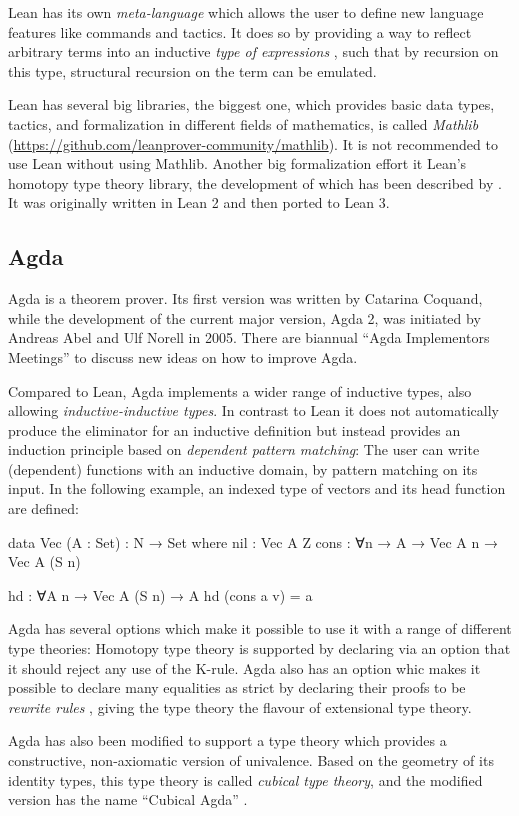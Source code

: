 Lean has its own \emph{meta-language} which allows the user to define new
language features like commands and tactics.
It does so by providing a way to reflect arbitrary terms into an inductive \emph{type of
expressions} ,
such that by recursion on this type, structural recursion on the term can 
be emulated.

Lean has several big libraries, the biggest one, which provides basic data types,
tactics, and formalization in different fields of mathematics, is called
\emph{Mathlib} (\url{https://github.com/leanprover-community/mathlib}).
It is not recommended to use Lean without using Mathlib.
Another big formalization effort it Lean's homotopy type theory library,
the development of which has been described by \citet{leanhott}.
It was originally written in Lean 2 and then ported to Lean 3.

\subsection{Agda}

Agda is a theorem prover. Its first version was written by Catarina Coquand, while
the development of the current major version, Agda 2, was initiated by
Andreas Abel and Ulf Norell in 2005.
There are biannual ``Agda Implementors Meetings'' to discuss new ideas on how to
improve Agda.

Compared to Lean, Agda implements a wider range of inductive types,
also allowing \emph{inductive-inductive types}.
In contrast to Lean it does not automatically produce the eliminator for an
inductive definition but instead provides an induction principle based
on \emph{dependent pattern matching}:
The user can write (dependent) functions with an inductive domain, by pattern
matching on its input.
In the following example, an indexed type of vectors and its head function are
defined:
\begin{agdacode}
data Vec (A : Set) : N → Set where
  nil : Vec A Z
  cons : ∀{n} → A → Vec A n → Vec A (S n)

hd : ∀{A n} → Vec A (S n) → A
hd (cons a v) = a
\end{agdacode}

Agda has several options which make it possible to use it with a range of different
type theories:
Homotopy type theory is supported by declaring via an option 
that it should reject any use of the K-rule.
Agda also has an option  whic makes it possible to declare
many equalities as strict by declaring their proofs to be \emph{rewrite rules}
\citep{cockxrewrite}, giving the type theory the flavour of extensional type
theory.

Agda has also been modified to support a type theory which provides
a constructive, non-axiomatic version of univalence.
Based on the geometry of its identity types, this type theory is called
\emph{cubical type theory}, and the modified version has the name
``Cubical Agda'' \citep{andrea:cubicalagda}.

% 








